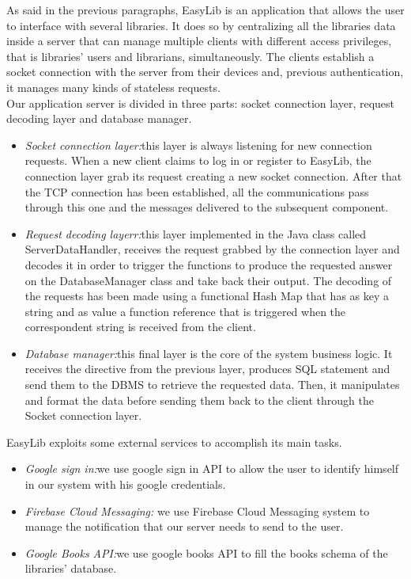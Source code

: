 As said in the previous paragraphs, EasyLib is an application that allows the user to interface with several libraries. It does so by centralizing all the libraries data inside a server that can manage multiple clients with different access privileges, that is libraries’ users and librarians, simultaneously. The clients establish a socket connection with the server from their devices and, previous authentication, it manages many kinds of stateless requests. \\
Our application server is divided in three parts: socket connection layer, request decoding layer and database manager.

\begin{itemize}
\item \emph{Socket connection layer:}this layer is always listening for new connection requests. When a new client claims to log in or register to EasyLib, the connection layer grab its request creating a new socket connection. After that the TCP connection has been established, all the communications pass through this one and the messages delivered to the subsequent component.
\item \emph{Request decoding layerr:}this layer implemented in the Java class called ServerDataHandler, receives the request grabbed by the connection layer and decodes it in order to trigger the functions to produce the requested answer on the DatabaseManager class and take back their output. The decoding of the requests has been made using a functional Hash Map that has as key a string and as value a function reference that is triggered when the correspondent string is received from the client.
\item \emph{Database manager:}this final layer is the core of the system business logic. It receives the directive from the previous layer, produces SQL statement and send them to the DBMS to retrieve the requested data. Then, it manipulates and format the data before sending them back to the client through the Socket connection layer.
\end{itemize}


EasyLib exploits some external services to accomplish its main tasks.

\begin{itemize}
\item \emph{Google sign in:}we use google sign in API to allow the user to identify himself in our system with his google credentials.
\item \emph{Firebase Cloud Messaging: } we use Firebase Cloud Messaging system to manage the notification that our server needs to send to the user.
\item \emph{Google Books API:}we use google books API to fill the books schema of the libraries’ database.\\
\end{itemize}

